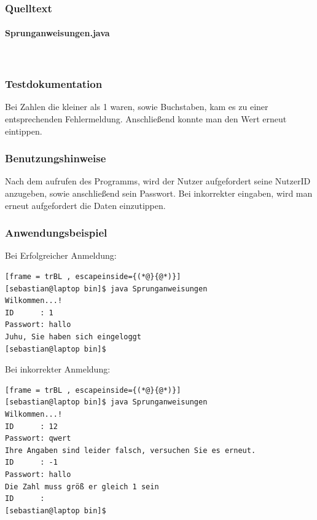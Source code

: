 \subsubsection{Quelltext}
\paragraph{Sprunganweisungen.java}\


\subsubsection{Testdokumentation}
Bei Zahlen die kleiner als 1 waren, sowie Buchstaben, kam es zu einer entsprechenden Fehlermeldung. Anschließend konnte man den Wert erneut eintippen.

\subsubsection{Benutzungshinweise}
Nach dem aufrufen des Programms, wird der Nutzer aufgefordert seine NutzerID anzugeben,
sowie anschlie\ss end sein Passwort. Bei inkorrekter eingaben, wird man erneut aufgefordert
die Daten einzutippen.

\subsubsection{Anwendungsbeispiel}
Bei Erfolgreicher Anmeldung:
\begin{lstlisting}[frame = trBL , escapeinside={(*@}{@*)}]
[sebastian@laptop bin]$ java Sprunganweisungen 	
Wilkommen...!
ID      : 1
Passwort: hallo
Juhu, Sie haben sich eingeloggt
[sebastian@laptop bin]$ 
\end{lstlisting}
Bei inkorrekter Anmeldung:
\begin{lstlisting}[frame = trBL , escapeinside={(*@}{@*)}]
[sebastian@laptop bin]$ java Sprunganweisungen 	
Wilkommen...!
ID      : 12
Passwort: qwert
Ihre Angaben sind leider falsch, versuchen Sie es erneut.
ID      : -1
Passwort: hallo
Die Zahl muss größ er gleich 1 sein
ID      : 
[sebastian@laptop bin]$ 
\end{lstlisting}